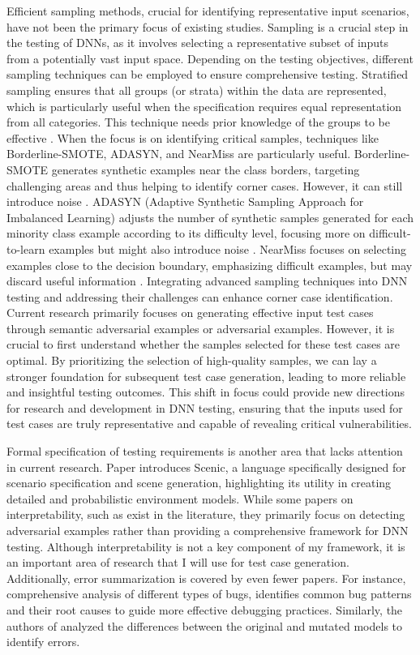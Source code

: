 Efficient sampling methods, crucial for identifying representative input scenarios, have not been the primary focus of existing studies. Sampling is a crucial step in the testing of DNNs, as it involves selecting a representative subset of inputs from a potentially vast input space. Depending on the testing objectives, different sampling techniques can be employed to ensure comprehensive testing. Stratified sampling ensures that all groups (or strata) within the data are represented, which is particularly useful when the specification requires equal representation from all categories. This technique needs prior knowledge of the groups to be effective \cite{Stratifiedsampling}. When the focus is on identifying critical samples, techniques like Borderline-SMOTE, ADASYN, and NearMiss are particularly useful. Borderline-SMOTE generates synthetic examples near the class borders, targeting challenging areas and thus helping to identify corner cases. However, it can still introduce noise \cite{Han2005}. ADASYN (Adaptive Synthetic Sampling Approach for Imbalanced Learning) adjusts the number of synthetic samples generated for each minority class example according to its difficulty level, focusing more on difficult-to-learn examples but might also introduce noise \cite{He2008}. NearMiss focuses on selecting examples close to the decision boundary, emphasizing difficult examples, but may discard useful information \cite{near-miss}. Integrating advanced sampling techniques into DNN testing and addressing their challenges can enhance corner case identification. Current research primarily focuses on generating effective input test cases through semantic adversarial examples or adversarial examples. However, it is crucial to first understand whether the samples selected for these test cases are optimal. By prioritizing the selection of high-quality samples, we can lay a stronger foundation for subsequent test case generation, leading to more reliable and insightful testing outcomes. This shift in focus could provide new directions for research and development in DNN testing, ensuring that the inputs used for test cases are truly representative and capable of revealing critical vulnerabilities.

Formal specification of testing requirements is another area that lacks attention in current research. Paper \cite{Scenic} introduces Scenic, a language specifically designed for scenario specification and scene generation, highlighting its utility in creating detailed and probabilistic environment models. While some papers on interpretability, such as \cite{Fidel, Lin, Walker, Rahnama, Watson, Kuppa} exist in the literature, they primarily focus on detecting adversarial examples rather than providing a comprehensive framework for DNN testing. Although interpretability is not a key component of my framework, it is an important area of research that I will use for test case generation. Additionally, error summarization is covered by even fewer papers. For instance, \cite{ChenJ} comprehensive analysis of different types of bugs, identifies common bug patterns and their root causes to guide more effective debugging practices. Similarly, the authors of \cite{Deepmutation} analyzed the differences between the original and mutated models to identify errors.

